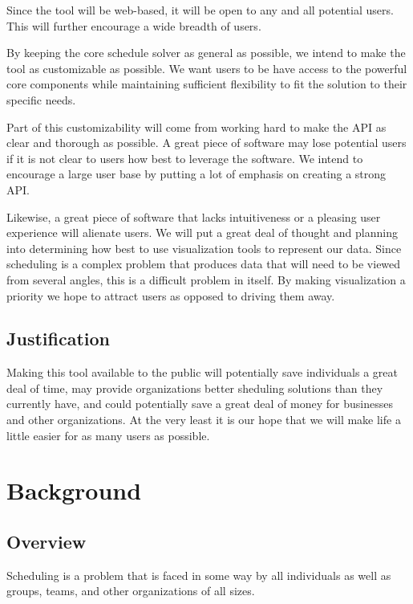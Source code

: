 \documentclass{extarticle}
\begin{document}
Since the tool will be web-based, it will be open to any and all potential users.  This will further encourage a
wide breadth of users.

By keeping the core schedule solver as general as possible, we intend to make the tool as customizable as possible.
We want users to be have access to the powerful core components while maintaining sufficient flexibility to fit the
solution to their specific needs.

Part of this customizability will come from working hard to make the API as clear and thorough as possible.  A
great piece of software may lose potential users if it is not clear to users how best to leverage the software.  We
intend to encourage a large user base by putting a lot of emphasis on creating a strong API.

Likewise, a great piece of software that lacks intuitiveness or a pleasing user experience will alienate users.
We will put a great deal of thought and planning into determining how best to use visualization tools to represent
our data.  Since scheduling is a complex problem that produces data that will need to be viewed from several angles,
this is a difficult problem in itself.  By making visualization a priority we hope to attract users as opposed to
driving them away.

\subsection{Justification}
Making this tool available to the public will potentially save individuals a great deal of time, may provide
organizations better sheduling solutions than they currently have, and could potentially save a great deal
of money for businesses and other organizations.  At the very least it is our hope that we will make life a little
easier for as many users as possible.

\section{Background}

\subsection{Overview} %
Scheduling is a problem that is faced in some way by all individuals as well as groups, teams, and other
organizations of all sizes.  
\end{document}
